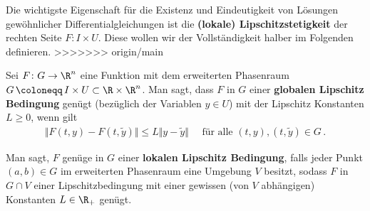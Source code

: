\documentclass[letterpaper,10pt,english]{jupyterBook}
\begin{document}
\par
Die wichtigste Eigenschaft für die Existenz und Eindeutigkeit von Lösungen gewöhnlicher Differentialgleichungen ist die \textbf{(lokale) Lipschitzstetigkeit} der rechten Seite \(F \colon I \times U\).
Diese wollen wir der Vollständigkeit halber im Folgenden definieren.
\label{ode/repetition:definition-8}
>>>>>>> origin/main
\begin{definition}{}{}



\par
Sei \(F \colon G \to \R^n\) eine Funktion mit dem erweiterten Phasenraum \(G \, \coloneqq \, I \times U \subset \R\times\R^n\).
Man sagt, dass \(F\) in \(G\) einer \textbf{globalen Lipschitz Bedingung} genügt (bezüglich der Variablen \(y \in U\)) mit der Lipschitz Konstanten \(L\geq0\), wenn gilt
\begin{align*}
\Vert F(t,y) - F(t,\widetilde{y}) \Vert \leq L \Vert y-\widetilde{y}\Vert\quad\text{ für alle }(t,y), (t,\widetilde{y})\in G\,.
\end{align*}
\par
Man sagt, \(F\) genüge in \(G\) einer \textbf{lokalen Lipschitz Bedingung}, falls jeder Punkt \((a,b)\in G\) im erweiterten Phasenraum eine Umgebung \(V\) besitzt, sodass \(F\) in \(G\cap V\) einer Lipschitzbedingung mit einer gewissen (von \(V\) abhängigen) Konstanten \(L\in\R_+\) genügt.
\end{definition}
\end{document}
